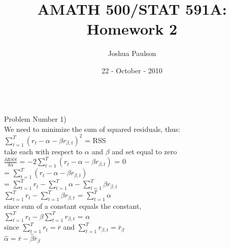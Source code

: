 \documentclass[11pt]{article}
\title{AMATH 500/STAT 591A: Homework 2}
\author{Joshua Paulson}
\date{22 - October - 2010}
\begin{document}
\maketitle{\textbf{}}\\
Problem Number 1)\\
We need to minimize the sum of squared residuals, thus:\\
$\sum_{t=1}^{T} (r_{t} - \alpha - \beta r_{\beta,t})^2$ = RSS\\
take each with respect to $\alpha$ and $\beta$ and set equal to zero\\
$\frac{\delta RSS}{\delta \alpha}$ = $-2 \sum_{t=1}^{T} (r_{t} - \alpha - \beta r_{\beta,t})$ = 0\\
= $\sum_{t=1}^{T} (r_{t} - \alpha - \beta r_{\beta,t})$\\
= $\sum_{t=1}^{T} r_{t} - \sum_{t=1}^{T} \alpha - \sum_{t=1}^{T} \beta r_{\beta,t}$\\
$\sum_{t=1}^{T} r_{t} - \sum_{t=1}^{T} \beta r_{\beta,t}$ = $\sum_{t=1}^{T} \alpha$\\
since sum of a constant equals the constant,\\
$\sum_{t=1}^{T} r_{t} - \beta \sum_{t=1}^{T} r_{\beta,t}$ = $\alpha$\\
since $\sum_{t=1}^{T} r_{t} = \bar{r}$ and $\sum_{t=1}^{T} r_{\beta,t} = \bar{r}_{\beta}$\\
$\hat{\alpha} = \bar{r} - \hat{\beta} \bar{r}_{\beta}$\\
\end{document}
